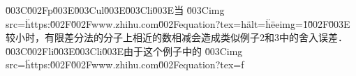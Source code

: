 \u003C\u002Fp\u003E\u003Cul\u003E\u003Cli\u003E当 \u003Cimg src=\"https:\u002F\u002Fwww.zhihu.com\u002Fequation?tex=h\" alt=\"h\" eeimg=\"1\"\u002F\u003E 较小时，有限差分法的分子上相近的数相减会造成类似例子2和3中的舍入误差．  \u003C\u002Fli\u003E\u003Cli\u003E由于这个例子中的 \u003Cimg src=\"https:\u002F\u002Fwww.zhihu.com\u002Fequation?tex=f%